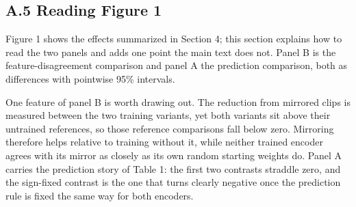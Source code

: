 \documentclass{article}
\begin{document}

\subsection{A.5 Reading Figure 1}\label{a.5-reading-figure-1}

Figure 1 shows the effects summarized in Section 4; this section
explains how to read the two panels and adds one point the main text
does not. Panel B is the feature-disagreement comparison and panel A the
prediction comparison, both as differences with pointwise 95\%
intervals.

One feature of panel B is worth drawing out. The reduction from mirrored
clips is measured between the two training variants, yet both variants
sit above their untrained references, so those reference comparisons
fall below zero. Mirroring therefore helps relative to training without
it, while neither trained encoder agrees with its mirror as closely as
its own random starting weights do. Panel A carries the prediction story
of Table 1: the first two contrasts straddle zero, and the sign-fixed
contrast is the one that turns clearly negative once the prediction rule
is fixed the same way for both encoders.
\end{document}
